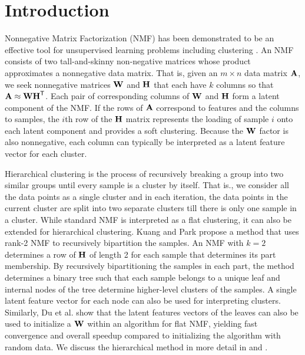 \documentclass[conference,compsoc]{IEEEtran}
\begin{document}

\section{Introduction}

Nonnegative Matrix Factorization (NMF) has been demonstrated to be an effective tool for unsupervised learning problems including clustering \cite{XLG03, SBPP06, DHS05}. 
An NMF consists of two tall-and-skinny non-negative matrices whose product approximates a nonnegative data matrix.
That is, given an $m\times n$ data matrix $\M{A}$, we seek nonnegative matrices $\M{W}$ and $\M{H}$ that each have $k$ columns so that $\M{A} \approx \M{W}\M{H}^\Tra$.
Each pair of corresponding columns of $\M{W}$ and $\M{H}$ form a latent component of the NMF.
If the rows of $\M{A}$ correspond to features and the columns to samples, the $i$th row of the $\M{H}$ matrix represents the loading of sample $i$ onto each latent component and provides a soft clustering.
Because the $\M{W}$ factor is also nonnegative, each column can typically be interpreted as a latent feature vector for each cluster.

Hierarchical clustering is the process of recursively breaking a group into two similar groups until every sample is a cluster by itself. That is., we consider all the data points as a single cluster and in each iteration, the data points in the current cluster are split into two separate clusters till there is only one sample in a cluster.
While standard NMF is interpreted as a flat clustering, it can also be extended for hierarchical clustering.
Kuang and Park \cite{KP13} propose a method that uses rank-2 NMF to recursively bipartition the samples.
An NMF with $k=2$ determines a row of $\M{H}$ of length 2 for each sample that determines its part membership.
By recursively bipartitioning the samples in each part, the method determines a binary tree such that each sample belongs to a unique leaf and internal nodes of the tree determine higher-level clusters of the samples.
A single latent feature vector for each node can also be used for interpreting clusters.
Similarly, Du et al. \cite{DKDP17} show that the latent features vectors of the leaves can also be used to initialize a $\M{W}$ within an algorithm for flat NMF, yielding fast convergence and overall speedup compared to initializing the algorithm with random data.
We discuss the hierarchical method in more detail in  and .
\end{document}
